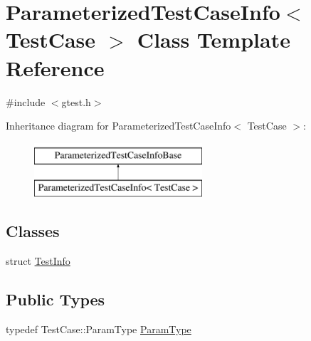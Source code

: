\hypertarget{classtesting_1_1internal_1_1ParameterizedTestCaseInfo}{\section{\-Parameterized\-Test\-Case\-Info$<$ \-Test\-Case $>$ \-Class \-Template \-Reference}
\label{d0/d69/classtesting_1_1internal_1_1ParameterizedTestCaseInfo}
}


{\ttfamily \#include $<$gtest.\-h$>$}

\-Inheritance diagram for \-Parameterized\-Test\-Case\-Info$<$ \-Test\-Case $>$\-:\begin{figure}[H]
\begin{center}
\leavevmode
\includegraphics[height=2.000000cm]{d0/d69/classtesting_1_1internal_1_1ParameterizedTestCaseInfo}
\end{center}
\end{figure}
\subsection*{\-Classes}
\begin{DoxyCompactItemize}
\item 
struct \hyperlink{structtesting_1_1internal_1_1ParameterizedTestCaseInfo_1_1TestInfo}{\-Test\-Info}
\end{DoxyCompactItemize}
\subsection*{\-Public \-Types}
\begin{DoxyCompactItemize}
\item 
typedef \-Test\-Case\-::\-Param\-Type \hyperlink{classtesting_1_1internal_1_1ParameterizedTestCaseInfo_ab50f5599aaeeb72dd821ed2d71ad8e35}{\-Param\-Type}
\end{DoxyCompactItemize}
